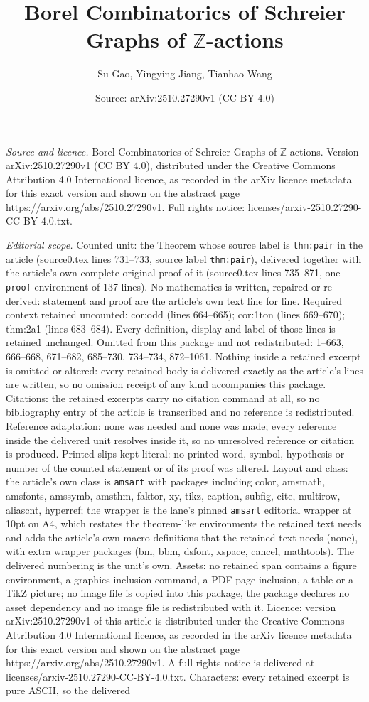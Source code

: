 \documentclass[10pt,a4paper]{amsart}
\title[Borel Combinatorics of Schreier Graphs of $\mathbb{Z}$-actio]{Borel Combinatorics of Schreier Graphs of $\mathbb{Z}$-actions}
\author{Su Gao, Yingying Jiang, Tianhao Wang}
\date{Source: arXiv:2510.27290v1 (CC BY 4.0)}
\begin{document}
\maketitle

\noindent\emph{Source and licence.} Borel Combinatorics of Schreier Graphs of $\mathbb{Z}$-actions. Version arXiv:2510.27290v1 (CC BY 4.0), distributed under the Creative Commons Attribution 4.0 International licence, as recorded in the arXiv licence metadata for this exact version and shown on the abstract page https://arxiv.org/abs/2510.27290v1. Full rights notice: licenses/arxiv-2510.27290-CC-BY-4.0.txt.\par\smallskip

\noindent\textit{Editorial scope.} Counted unit: the Theorem whose source label is \texttt{thm:pair} in the article (source0.tex lines 731--733, source label \texttt{thm:pair}), delivered together with the article's own complete original proof of it (source0.tex lines 735--871, one \texttt{proof} environment of 137 lines). No mathematics is written, repaired or re-derived: statement and proof are the article's own text line for line. Required context retained uncounted: cor:odd (lines 664--665); cor:1ton (lines 669--670); thm:2a1 (lines 683--684). Every definition, display and label of those lines is retained unchanged. Omitted from this package and not redistributed: 1--663, 666--668, 671--682, 685--730, 734--734, 872--1061. Nothing inside a retained excerpt is omitted or altered: every retained body is delivered exactly as the article's lines are written, so no omission receipt of any kind accompanies this package. Citations: the retained excerpts carry no citation command at all, so no bibliography entry of the article is transcribed and no reference is redistributed. Reference adaptation: none was needed and none was made; every reference inside the delivered unit resolves inside it, so no unresolved reference or citation is produced. Printed slips kept literal: no printed word, symbol, hypothesis or number of the counted statement or of its proof was altered. Layout and class: the article's own class is \texttt{amsart} with packages including color, amsmath, amsfonts, amssymb, amsthm, faktor, xy, tikz, caption, subfig, cite, multirow, aliascnt, hyperref; the wrapper is the lane's pinned \texttt{amsart} editorial wrapper at 10pt on A4, which restates the theorem-like environments the retained text needs and adds the article's own macro definitions that the retained text needs (none), with extra wrapper packages (bm, bbm, dsfont, xspace, cancel, mathtools). The delivered numbering is the unit's own. Assets: no retained span contains a figure environment, a graphics-inclusion command, a PDF-page inclusion, a table or a TikZ picture; no image file is copied into this package, the package declares no asset dependency and no image file is redistributed with it. Licence: version arXiv:2510.27290v1 of this article is distributed under the Creative Commons Attribution 4.0 International licence, as recorded in the arXiv licence metadata for this exact version and shown on the abstract page https://arxiv.org/abs/2510.27290v1. A full rights notice is delivered at licenses/arxiv-2510.27290-CC-BY-4.0.txt. Characters: every retained excerpt is pure ASCII, so the delivered 
\end{document}
